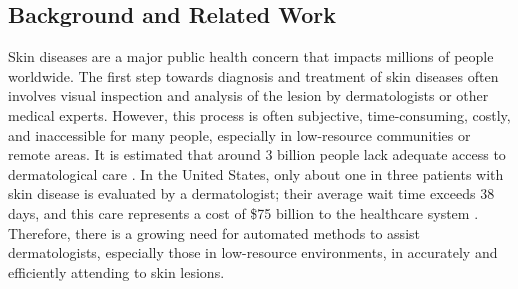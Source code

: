 \documentclass[11pt]{ucthesis}
\begin{document}
\subsection{Background and Related Work}\label{sec:intro}
Skin diseases are a major public health concern that impacts millions of people worldwide. The first step towards diagnosis and treatment of skin diseases often involves visual inspection and analysis of the lesion by dermatologists or other medical experts. However, this process is often subjective, time-consuming, costly, and inaccessible for many people, especially in low-resource communities or remote areas. It is estimated that around 3 billion people lack adequate access to dermatological care \cite{coustasse_2019_use}. In the United States, only about one in three patients with skin disease is evaluated by a dermatologist; their average wait time exceeds 38 days, and this care represents a cost of \$75 billion to the healthcare system \cite{a2016_burden,tsang_2006_even}. Therefore, there is a growing need for automated methods to assist dermatologists, especially those in low-resource environments, in accurately and efficiently attending to skin lesions.
\end{document}
